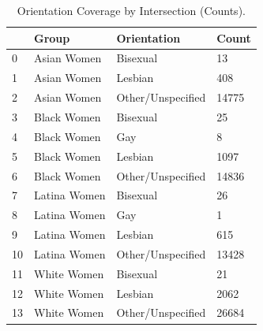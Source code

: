 \begin{table}[htbp]
\centering
\caption{Orientation Coverage by Intersection (Counts).}
\label{tab:eda_orientation_by_group}
\begin{tabular}{llll}
\toprule
 & Group & Orientation & Count \\
\midrule
0 & Asian Women & Bisexual & 13 \\
1 & Asian Women & Lesbian & 408 \\
2 & Asian Women & Other/Unspecified & 14775 \\
3 & Black Women & Bisexual & 25 \\
4 & Black Women & Gay & 8 \\
5 & Black Women & Lesbian & 1097 \\
6 & Black Women & Other/Unspecified & 14836 \\
7 & Latina Women & Bisexual & 26 \\
8 & Latina Women & Gay & 1 \\
9 & Latina Women & Lesbian & 615 \\
10 & Latina Women & Other/Unspecified & 13428 \\
11 & White Women & Bisexual & 21 \\
12 & White Women & Lesbian & 2062 \\
13 & White Women & Other/Unspecified & 26684 \\
\bottomrule
\end{tabular}

\end{table}